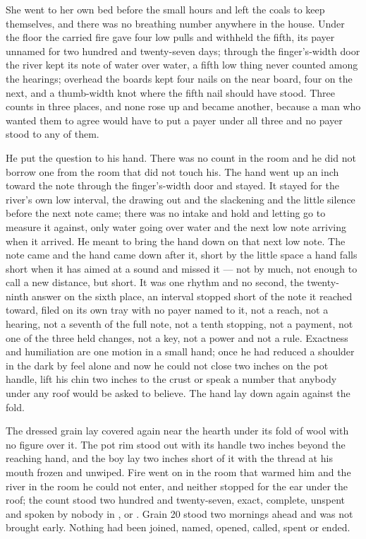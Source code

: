 She went to her own bed before the small hours and left the coals to keep themselves, and there was no breathing number anywhere in the house. Under the floor the carried fire gave four low pulls and withheld the fifth, its payer unnamed for two hundred and twenty-seven days; through the finger's-width door the river kept its note of water over water, a fifth low thing never counted among the hearings; overhead the boards kept four nails on the near board, four on the next, and a thumb-width knot where the fifth nail should have stood. Three counts in three places, and none rose up and became another, because a man who wanted them to agree would have to put a payer under all three and no payer stood to any of them.

He put the question to his hand. There was no count in the room and he did not borrow one from the room that did not touch his. The hand went up an inch toward the note through the finger's-width door and stayed. It stayed for the river's own low interval, the drawing out and the slackening and the little silence before the next note came; there was no intake and hold and letting go to measure it against, only water going over water and the next low note arriving when it arrived. He meant to bring the hand down on that next low note. The note came and the hand came down after it, short by the little space a hand falls short when it has aimed at a sound and missed it --- not by much, not enough to call a new distance, but short. It was one rhythm and no second, the twenty-ninth answer on the sixth place, an interval stopped short of the note it reached toward, filed on its own tray with no payer named to it, not a reach, not a hearing, not a seventh of the full note, not a tenth stopping, not a payment, not one of the three held changes, not a key, not a power and not a rule. Exactness and humiliation are one motion in a small hand; once he had reduced a shoulder in the dark by feel alone and now he could not close two inches on the pot handle, lift his chin two inches to the crust or speak a number that anybody under any roof would be asked to believe. The hand lay down again against the fold.

The dressed grain lay covered again near the hearth under its fold of wool with no figure over it. The pot rim stood out with its handle two inches beyond the reaching hand, and the boy lay two inches short of it with the thread at his mouth frozen and unwiped. Fire went on in the room that warmed him and the river in the room he could not enter, and neither stopped for the ear under the roof; the count stood two hundred and twenty-seven, exact, complete, unspent and spoken by nobody in ,  or . Grain 20 stood two mornings ahead and was not brought early. Nothing had been joined, named, opened, called, spent or ended.
